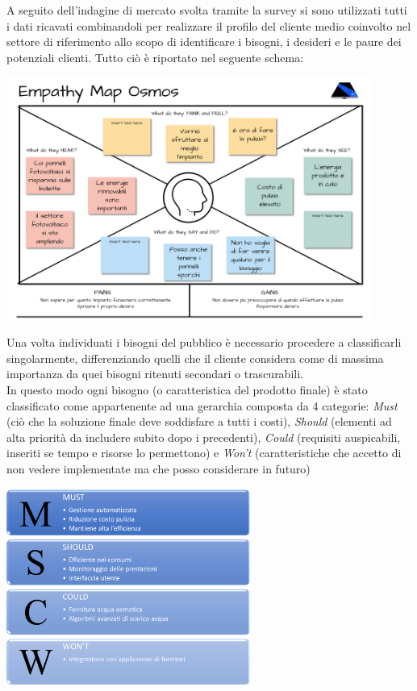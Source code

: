 \documentclass[a4paper, 12pt]{article}
\begin{document}
	A seguito dell'indagine di mercato svolta tramite la survey si sono utilizzati tutti i dati ricavati combinandoli per realizzare il profilo del cliente medio coinvolto nel settore di riferimento allo scopo di identificare i bisogni, i desideri e le paure dei potenziali clienti. Tutto ciò è riportato nel seguente schema:
	\begin{center}
		\includegraphics[width=0.9\textwidth]{Images/EmpathyMap.png}
	\end{center}
	Una volta individuati i bisogni del pubblico è necessario procedere a classificarli singolarmente, differenziando quelli che il cliente considera come di massima importanza da quei bisogni ritenuti secondari o trascurabili.\\
	In questo modo ogni bisogno (o caratteristica del prodotto finale) è stato classificato come appartenente ad una gerarchia composta da 4 categorie: \emph{Must} (ciò che la soluzione finale deve soddisfare a tutti i costi), \emph{Should} (elementi ad alta priorità da includere subito dopo i precedenti), \emph{Could} (requisiti auspicabili, inseriti se tempo e risorse lo permettono) e \emph{Won't} (caratteristiche che accetto di non vedere implementate ma che posso considerare in futuro)
	\begin{center}
		\includegraphics[width=0.6\textwidth]{Images/MoSCoW.png}
	\end{center}
\end{document}
